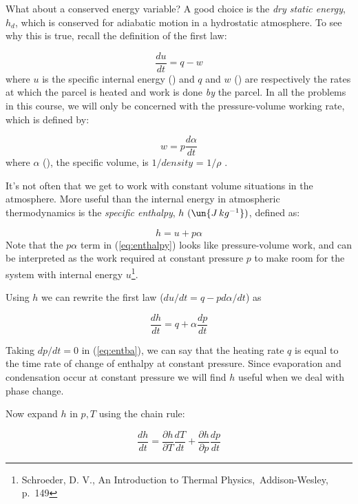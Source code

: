 \documentclass[12pt]{article}
\begin{document}
What about a conserved energy variable?  A good choice is the \textit{dry static energy},
$h_d$, which is conserved for adiabatic motion in a hydrostatic atmosphere.
To see why this is true, recall the definition of the first law:


\begin{equation}
  \label{eq:firstwh}
  \frac{du}{dt} = q - w
\end{equation}
where $u$ is the specific internal energy (\jkg) and $q$ and $w$ (\jkgs) are respectively the
rates at which the parcel is heated and work is done \textit{by} the parcel.
In all the problems in this course, we will only be concerned with the pressure-volume
working rate, which is defined by:

\begin{equation}
  \label{eq:pvwork}
  w = p \frac{d \alpha}{dt}
\end{equation}
where $\alpha$  (\volkg), the specific volume, is $1/density$ = $1/\rho$ .

It's not often that we get to work with constant volume situations in
the atmosphere.  More useful than the internal energy in atmospheric
thermodynamics is the \textit{specific enthalpy}, $h\ 
(\un{J\,kg^{-1}})$, defined as:

\begin{equation}
  \label{eq:enthalpy}
  h  = u + p\alpha
\end{equation}
Note that the $p \alpha$ term in (\ref{eq:enthalpy}) looks like pressure-volume
work, and can be interpreted as the work required at constant pressure $p$
to make room for the system with internal energy $u$\footnote{Schroeder, D. V., An Introduction
to Thermal Physics,\ Addison-Wesley, p.~149}.

Using $h$ we can rewrite the first law ($du/dt = q - p d\alpha/dt$) as

\begin{equation}
  \label{eq:entba}
  \frac{dh}{dt} = q   + \alpha \frac{dp}{dt}
\end{equation}

Taking $dp/dt=0$ in (\ref{eq:entba}), we can say that the heating rate
$q$ is equal to the time rate of change of enthalpy at constant
pressure.  Since evaporation and condensation occur at constant
pressure we will find $h$ useful when we deal with phase change.

Now expand $h$ in $p,T$ using the chain rule:

\begin{equation}
  \label{eq:Hchain}
  \frac{dh}{dt} = \frac{\partial h}{\partial T} \frac{dT}{dt} + 
                  \frac{\partial h}{\partial p} \frac{dp}{dt}
\end{equation}
\end{document}
